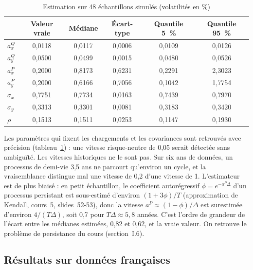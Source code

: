 \begin{table}[htbp]
\centering\small
\caption{Estimation sur 48 échantillons simulés (volatilités en \%)}
\label{tab:kalman_sim}
\begin{tabular}{@{}lccccc@{}}
\toprule
 & Valeur vraie & Médiane & Écart-type & Quantile 5~\% & Quantile 95~\% \\
\midrule
$a_x^Q$ & 0,0118 & 0,0117 & 0,0006 & 0,0109 & 0,0126 \\
$a_y^Q$ & 0,0500 & 0,0499 & 0,0015 & 0,0480 & 0,0526 \\
$a_x^P$ & 0,2000 & 0,8173 & 0,6231 & 0,2291 & 2,3023 \\
$a_y^P$ & 0,2000 & 0,6166 & 0,7056 & 0,1042 & 1,7754 \\
$\sigma_x$ & 0,7751 & 0,7734 & 0,0163 & 0,7439 & 0,7970 \\
$\sigma_y$ & 0,3313 & 0,3301 & 0,0081 & 0,3183 & 0,3420 \\
$\rho$ & 0,1513 & 0,1511 & 0,0253 & 0,1147 & 0,1930 \\
\bottomrule
\end{tabular}
\end{table}

Les paramètres qui fixent les chargements et les covariances sont retrouvés avec précision
(tableau~\ref{tab:kalman_sim}) : une vitesse risque-neutre de 0,05 serait détectée sans ambiguïté. Les vitesses
historiques ne le sont pas. Sur six ans de données, un processus de demi-vie 3,5 ans ne parcourt qu'environ un
cycle, et la vraisemblance distingue mal une vitesse de 0,2 d'une vitesse de 1. L'estimateur est de plus biaisé :
en petit échantillon, le coefficient autorégressif $\phi = e^{-a^P\Delta}$ d'un processus persistant est
sous-estimé d'environ $(1+3\phi)/T$ (approximation de Kendall, cours~5, slides~52-53), donc la vitesse
$a^P \approx (1-\phi)/\Delta$ est surestimée d'environ $4/(T\Delta)$, soit 0,7 pour $T\Delta \approx 5{,}8$ années.
C'est l'ordre de grandeur de l'écart entre les médianes estimées, 0,82 et 0,62, et la vraie valeur. On retrouve le
problème de persistance du cours (section~I.6).

\subsection{Résultats sur données françaises}

